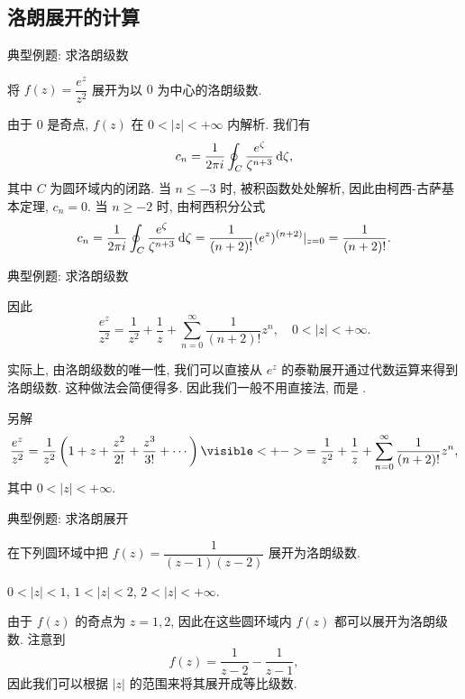 \subsection{洛朗展开的计算}
\begin{frame}{典型例题: 求洛朗级数}
\beqskip{9pt}
\begin{example}
将 $f(z)=\dfrac{e^z}{z^2}$ 展开为以 $0$ 为中心的洛朗级数.
\end{example}
\begin{solution}
由于 $0$ 是奇点, $f(z)$ 在 $0<|z|<+\infty$ 内解析.
\onslide<+->
我们有
\[c_n=\frac1{2\pi i}\oint_C\frac{e^\zeta}{\zeta^{n+3}}\,\mathrm{d}\zeta,\]
其中 $C$ 为圆环域内的闭路.
\onslide<+->
当 $n\le -3$ 时, 被积函数处处解析, 因此由柯西-古萨基本定理, $c_n=0$.
\onslide<+->
当 $n\ge -2$ 时, 由柯西积分公式
\[c_n=\frac1{2\pi i}\oint_C\frac{e^\zeta}{\zeta^{n+3}}\,\mathrm{d}\zeta
=\frac1{(n+2)!}(e^z)^{(n+2)}|_{z=0}=\frac1{(n+2)!}.\]
\end{solution}
\endgroup
\end{frame}


\begin{frame}{典型例题: 求洛朗级数}
\begin{solutionc}
因此
\vspace{-\baselineskip}
\[\frac{e^z}{z^2}=\frac1{z^2}+\frac1z+\sum_{n=0}^\infty \frac1{(n+2)!}z^n,\quad 0<|z|<+\infty.\]
\vspace{-10pt}
\end{solutionc}
\onslide<+->
实际上, 由洛朗级数的唯一性, 我们可以直接从 $e^z$ 的泰勒展开通过代数运算来得到洛朗级数.
\onslide<+->
这种做法会简便得多.
\onslide<+->
因此我们一般\alert{不用直接法}, 而是 .
\begin{block}{另解}
\vspace{-\baselineskip}
\[\frac{e^z}{z^2}=\frac1{z^2}\left(1+z+\frac{z^2}{2!}+\frac{z^3}{3!}+\cdots\right)
\visible<+->{=\frac1{z^2}+\frac1z+\sum_{n=0}^\infty \frac1{(n+2)!}z^n,}\]
其中 $0<|z|<+\infty$.
\end{block}
\end{frame}


\begin{frame}{典型例题: 求洛朗展开}
\begin{example}
在下列圆环域中把 $f(z)=\dfrac1{(z-1)(z-2)}$ 展开为洛朗级数.

\onslide<+->
 $0<|z|<1$,  $1<|z|<2$,  $2<|z|<+\infty$. 
\end{example}
\begin{solution}
由于 $f(z)$ 的奇点为 $z=1,2$, 因此在这些圆环域内 $f(z)$ 都可以展开为洛朗级数.
\onslide<+->
注意到
\[f(z)=\frac1{z-2}-\frac1{z-1},\]
因此我们可以根据 $|z|$ 的范围来将其展开成等比级数.
\end{solution}
\end{frame}


